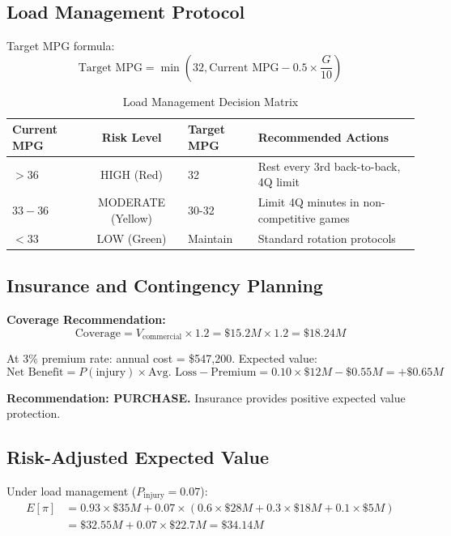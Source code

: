 \documentclass{mcmthesis}
\begin{document}
\subsection{Load Management Protocol}

Target MPG formula:
\begin{equation}
\text{Target MPG} = \min\left(32, \text{Current MPG} - 0.5 \times \frac{G}{10}\right)
\end{equation}

\begin{table}[H]
\centering
\caption{Load Management Decision Matrix}
\begin{tabular}{lcll}
\toprule
\textbf{Current MPG} & \textbf{Risk Level} & \textbf{Target MPG} & \textbf{Recommended Actions} \\
\midrule
$>36$ & HIGH (Red) & 32 & Rest every 3rd back-to-back, 4Q limit \\
$33-36$ & MODERATE (Yellow) & 30-32 & Limit 4Q minutes in non-competitive games \\
$<33$ & LOW (Green) & Maintain & Standard rotation protocols \\
\bottomrule
\end{tabular}
\end{table}

\subsection{Insurance and Contingency Planning}

\textbf{Coverage Recommendation:}
\begin{equation}
\text{Coverage} = V_{\text{commercial}} \times 1.2 = \$15.2M \times 1.2 = \$18.24M
\end{equation}

At 3\% premium rate: annual cost = \$547,200. Expected value:
\begin{equation}
\text{Net Benefit} = P(\text{injury}) \times \text{Avg. Loss} - \text{Premium} = 0.10 \times \$12M - \$0.55M = +\$0.65M
\end{equation}

\textbf{Recommendation: PURCHASE.} Insurance provides positive expected value protection.

\subsection{Risk-Adjusted Expected Value}

Under load management ($P_{\text{injury}} = 0.07$):
\begin{align}
E[\pi] &= 0.93 \times \$35M + 0.07 \times (0.6 \times \$28M + 0.3 \times \$18M + 0.1 \times \$5M) \\
&= \$32.55M + 0.07 \times \$22.7M = \$34.14M
\end{align}
\end{document}
